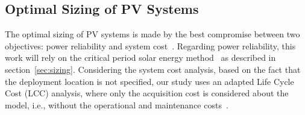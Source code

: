 \documentclass[runningheads]{llncs}
\begin{document}
\subsection{Optimal Sizing of PV Systems}
%
The optimal sizing of PV systems is made by the best compromise between two objectives: power reliability and system cost~\cite{Alsadi2018}. 
Regarding power reliability, this work will rely on the critical period solar energy method~\cite{Pinho} as described in section~\ref{sec:sizing}. 
Considering the system cost analysis, based on the fact that the deployment location is not specified, our study uses an adapted Life Cycle Cost (LCC) analysis, where only the acquisition cost is considered about the model, i.e., without the operational and maintenance costs~\cite{Alsadi2018}.
\end{document}
